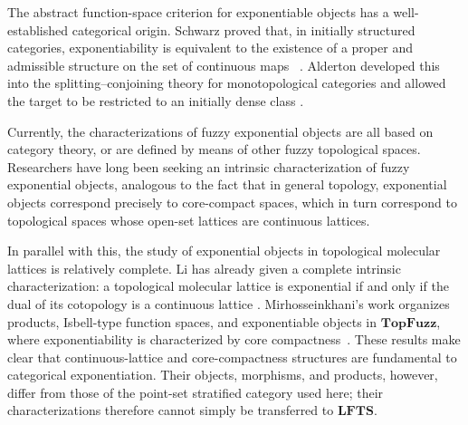 \documentclass[11pt,a4paper]{article}
\numberwithin{equation}{section}
\theoremstyle{definition}
\theoremstyle{remark}
\newcommand{\LFTS}{\mathbf{LFTS}}
\begin{document}
The abstract function-space criterion for exponentiable objects has a
well-established categorical origin.  Schwarz proved that, in initially
structured categories, exponentiability is equivalent to the existence
of a proper and admissible structure on the set of continuous maps
~\cite{Schwarz1983-en}.  Alderton developed this into the
splitting--conjoining theory for monotopological categories and allowed
the target to be restricted to an initially dense class \cite{Alderton1988-en}. %

Currently, the characterizations of fuzzy exponential objects are all based on category theory, or are defined by means of other fuzzy topological spaces. Researchers have long been seeking an intrinsic characterization of fuzzy exponential objects, analogous to the fact that in general topology, exponential objects correspond precisely to core-compact spaces, which in turn correspond to topological spaces whose open-set lattices are continuous lattices.

In parallel with this, the study of exponential objects in topological molecular lattices is relatively complete. Li has already given a complete intrinsic characterization: a topological molecular lattice is exponential if and only if the dual of its cotopology is a continuous lattice \cite{Li1999-en}. Mirhosseinkhani's work
organizes
products, Isbell-type function spaces, and exponentiable objects in
\(\mathbf{TopFuzz}\), where exponentiability is characterized by core
compactness~\cite{Mirhosseinkhani2024-en}.  These results make clear
that continuous-lattice and core-compactness structures are fundamental
to categorical exponentiation.  Their objects, morphisms, and products,
however, differ from those of the point-set stratified category used
here; their characterizations therefore cannot simply be transferred
to \(\LFTS\).
\end{document}
